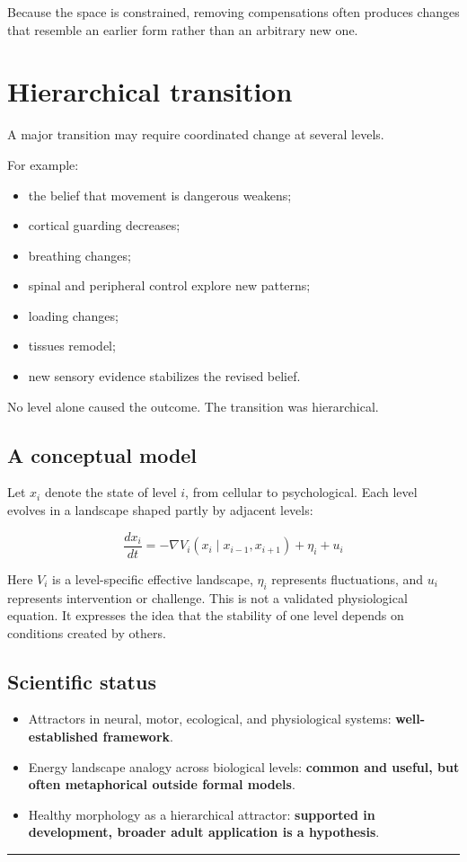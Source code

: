 Because the space is constrained, removing compensations often produces changes that resemble an earlier form rather than an arbitrary new one.

\section{Hierarchical transition}

A major transition may require coordinated change at several levels.

For example:

\begin{itemize}
\tightlist
\item
  the belief that movement is dangerous weakens;
\item
  cortical guarding decreases;
\item
  breathing changes;
\item
  spinal and peripheral control explore new patterns;
\item
  loading changes;
\item
  tissues remodel;
\item
  new sensory evidence stabilizes the revised belief.
\end{itemize}

No level alone caused the outcome. The transition was hierarchical.

\subsection{A conceptual model}

Let \(x_i\) denote the state of level \(i\), from cellular to psychological. Each level evolves in a landscape shaped partly by adjacent levels:

\[
\frac{dx_i}{dt} = -\nabla V_i(x_i \mid x_{i-1}, x_{i+1}) + \eta_i + u_i
\]

Here \(V_i\) is a level-specific effective landscape, \(\eta_i\) represents fluctuations, and \(u_i\) represents intervention or challenge. This is not a validated physiological equation. It expresses the idea that the stability of one level depends on conditions created by others.

\subsection{Scientific status}

\begin{itemize}
\tightlist
\item
  Attractors in neural, motor, ecological, and physiological systems: \textbf{well-established framework}.
\item
  Energy landscape analogy across biological levels: \textbf{common and useful, but often metaphorical outside formal models}.
\item
  Healthy morphology as a hierarchical attractor: \textbf{supported in development, broader adult application is a hypothesis}.
\end{itemize}

\begin{center}\rule{0.5\linewidth}{0.5pt}\end{center}
